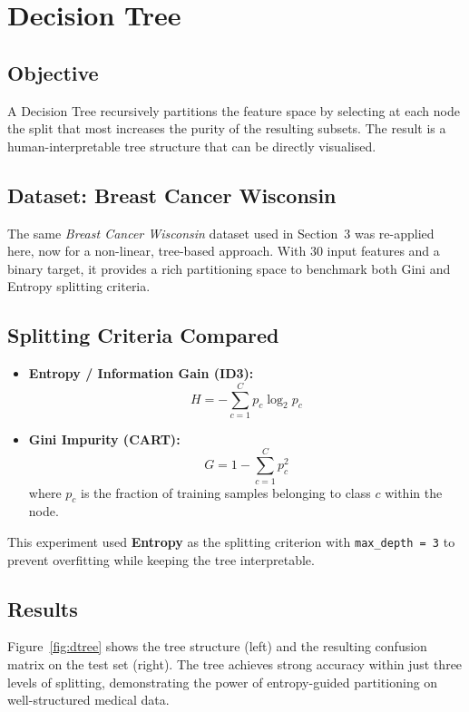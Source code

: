 \documentclass[12pt]{article}
\begin{document}
\section{Decision Tree}

\subsection{Objective}
A Decision Tree recursively partitions the feature space by selecting at each node the split that most increases the purity of the resulting subsets. The result is a human-interpretable tree structure that can be directly visualised.

\subsection{Dataset: Breast Cancer Wisconsin}
The same \textit{Breast Cancer Wisconsin} dataset used in Section~3 was re-applied here, now for a non-linear, tree-based approach. With 30 input features and a binary target, it provides a rich partitioning space to benchmark both Gini and Entropy splitting criteria.

\subsection{Splitting Criteria Compared}
\begin{itemize}[leftmargin=2em, itemsep=3pt]
    \item \textbf{Entropy / Information Gain (ID3):}
    \[
    H = -\sum_{c=1}^{C} p_c \log_2 p_c
    \]
    \item \textbf{Gini Impurity (CART):}
    \[
    G = 1 - \sum_{c=1}^{C} p_c^2
    \]
    where $p_c$ is the fraction of training samples belonging to class $c$ within the node.
\end{itemize}

This experiment used \textbf{Entropy} as the splitting criterion with \texttt{max\_depth = 3} to prevent overfitting while keeping the tree interpretable.

\subsection{Results}
Figure~\ref{fig:dtree} shows the tree structure (left) and the resulting confusion matrix on the test set (right). The tree achieves strong accuracy within just three levels of splitting, demonstrating the power of entropy-guided partitioning on well-structured medical data.
\end{document}
